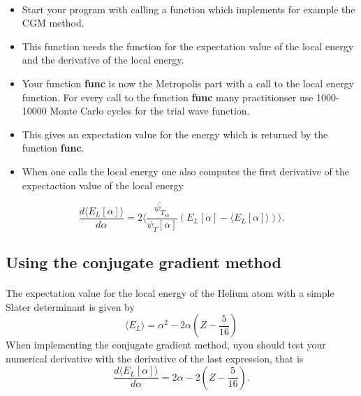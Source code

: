 \documentclass[%
twoside,                 %
final,                   %
10pt]{article}
\begin{document}
\paragraph{}
\begin{itemize}
  \item Start your program with calling a function which implements for example the  CGM method.

  \item This function needs the function for the expectation value of the local energy and the derivative of the local energy.

  \item Your function \textbf{func} is now the Metropolis part with a call to the local energy function. For every call to the function \textbf{func} many practitionser use 1000-10000 Monte Carlo cycles for the trial wave function.

  \item This gives an expectation value for the energy which is returned by the function \textbf{func}.

  \item When one calls the local energy one also computes the first derivative of the expectaction value of the local energy  
\end{itemize}

\noindent
\begin{equation*} \frac{d\langle E_{L}[\alpha] \rangle}{d\alpha}= 2\langle \frac{\bar{\psi_T}_{\alpha}}{\psi_T[\alpha]}\left(E_L[\alpha]-\langle  E_L[\alpha]\rangle\right)\rangle.
\end{equation*}




\subsection*{Using the conjugate gradient method}

\paragraph{}
The expectation value for the local energy of the Helium atom with a simple Slater determinant is given by
\begin{equation*}
\langle E_{L} \rangle = \alpha^2-2\alpha\left(Z-\frac{5}{16}\right)
\end{equation*}
When implementing the conjugate gradient method, uyou should test your numerical derivative with the derivative of the last expression, that is
\begin{equation*}
\frac{d\langle E_{L}[\alpha] \rangle}{d\alpha} = 2\alpha-2\left(Z-\frac{5}{16}\right).
\end{equation*}
\end{document}
